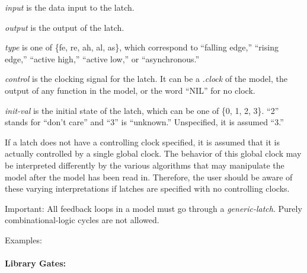 {\begin{pespace}

\begin{description}
\item {\em input} is the data input to the latch.

\item {\em output} is the output of the latch.

\item {\em type} is one of \{fe, re, ah, al, as\}, which correspond to
``falling edge,'' ``rising edge,'' ``active high,'' ``active low,'' or
``asynchronous.''  

\item {\em control} is the clocking signal for the latch.  It can be a {\em
.clock} of the model, the output of any function in the model, or the word
``NIL'' for no clock.

\item {\em init-val} is the initial state of the latch, which can be one of
\{0, 1, 2, 3\}.  ``2'' stands for ``don't care'' and ``3'' is ``unknown.''
Unspecified, it is assumed ``3.''
\end{description}

If a latch does not have a controlling clock specified, it is assumed that
it is actually controlled by a single global clock.  The behavior of this
global clock may be interpreted differently by the various algorithms that
may manipulate the model after the model has been read in.  Therefore, the
user should be aware of these varying interpretations if latches are
specified with no controlling clocks.

Important: All feedback loops in a model must go through a {\em
generic-latch}.  Purely combinational-logic cycles are not allowed.

Examples:

\paragraph{Library Gates:}


\end{pespace}}
